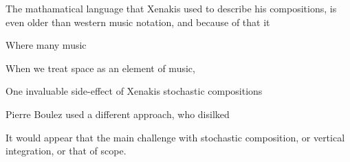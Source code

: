The mathamatical language that Xenakis used to describe his
compositions, is even older than western music notation, and because
of that it 

Where many music 

When we treat space as an element of music, 


One invaluable side-effect of Xenakis stochastic compositions 


Pierre Boulez used a different approach, who disilked 

It would appear that the main challenge with stochastic composition,
or vertical integration, or that of scope. 



